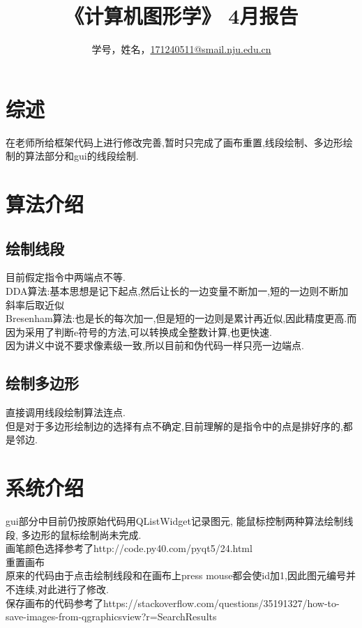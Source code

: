 \documentclass[a4paper,UTF8]{article}
\theoremstyle{definition}
\begin{document}
\title{\textbf{《计算机图形学》 4月报告 }}
\author{学号，姓名，\href{mailto:xxx@xxx.com}{171240511@smail.nju.edu.cn}}
\maketitle

\section{综述}
在老师所给框架代码上进行修改完善,暂时只完成了画布重置,线段绘制、多边形绘制的算法部分和gui的线段绘制.

\section{算法介绍}
\subsection{绘制线段}
目前假定指令中两端点不等.\\
\indent DDA算法:基本思想是记下起点,然后让长的一边变量不断加一,短的一边则不断加斜率后取近似\cite{rog_2002}\\
\indent Bresenham算法:也是长的每次加一,但是短的一边则是累计再近似,因此精度更高.而因为采用了判断e符号的方法,可以转换成全整数计算,也更快速.\cite{rog_2002}\\
\indent 因为讲义中说不要求像素级一致,所以目前和伪代码一样只亮一边端点.
\subsection{绘制多边形}
直接调用线段绘制算法连点.\\
\indent 但是对于多边形绘制边的选择有点不确定,目前理解的是指令中的点是排好序的,都是邻边.
		
\section{系统介绍}
gui部分中目前仍按原始代码用QListWidget记录图元, 能鼠标控制两种算法绘制线段,
多边形的鼠标绘制尚未完成.\\
画笔颜色选择参考了http://code.py40.com/pyqt5/24.html\\
重置画布\\
原来的代码由于点击绘制线段和在画布上press mouse都会使id加1,因此图元编号并不连续,对此进行了修改.\\
保存画布的代码参考了https://stackoverflow.com/questions/35191327/how-to-save-images-from-qgraphicsview?r=SearchResults\\
\end{document}
